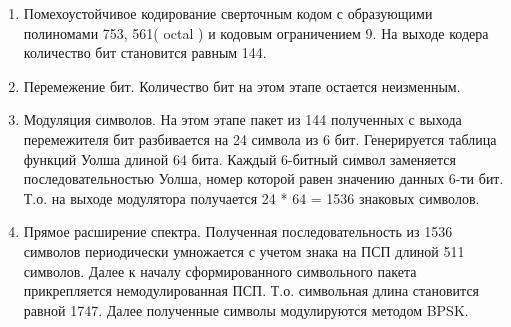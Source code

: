 \documentclass[a4paper,12pt]{article}
\begin{document}
\begin{enumerate}

\item Помехоустойчивое кодирование сверточным кодом с образующими полиномами 753, 561( octal ) и кодовым ограничением 9. На выходе кодера количество бит становится равным 144.
\item Перемежение бит. Количество бит на этом этапе остается неизменным.
\item Модуляция символов. На этом этапе пакет из 144 полученных с выхода перемежителя бит разбивается на 24 символа из 6 бит. Генерируется таблица функций Уолша длиной 64 бита. Каждый 6-битный символ заменяется последовательностью Уолша, номер которой равен значению данных 6-ти бит. Т.о. на выходе модулятора получается 24 * 64 = 1536 знаковых символов.
\item Прямое расширение спектра. Полученная последовательность из 1536 символов периодически умножается с учетом знака на ПСП длиной 511 символов. Далее к началу сформированного символьного пакета прикрепляется немодулированная ПСП. Т.о. символьная длина становится равной 1747. Далее полученные символы модулируются методом BPSK.
\end{enumerate}
\newpage
\end{document}
